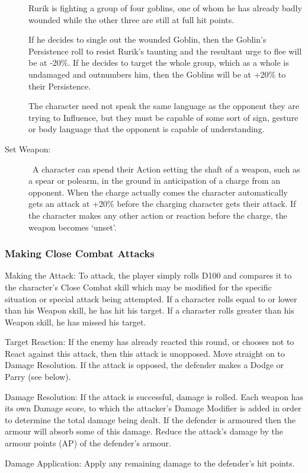 \begin{description}
	\begin{rpg-examplebox}
Rurik is fighting a group of four goblins, one of whom he has already badly wounded while the other three are still at full hit points. 

If he decides to single out the wounded Goblin, then the Goblin’s Persistence roll to resist Rurik’s taunting and the resultant urge to flee will be at -20\%. If he decides to target the whole group, which as a whole is undamaged and outnumbers him, then the Goblins will be at +20\% to their Persistence. 
	\end{rpg-examplebox}

The character need not speak the same language as the opponent they are trying to Influence, but they must be capable of some sort of sign, gesture or body language that the opponent is capable of understanding.

	\item[Set Weapon:]  A character can spend their Action setting the shaft of a weapon, such as a spear or polearm, in the ground in anticipation of a charge from an opponent. When the charge actually comes the character automatically gets an attack at +20\% before the charging character gets their attack. If the character makes any other action or reaction before the charge, the weapon becomes ‘unset’.
\end{description}


\subsubsection{Making Close Combat Attacks}
\begin{rpg-list}
\item Making the Attack: To attack, the player simply rolls D100 and compares it to the character’s Close Combat skill which may be modified for the specific situation or special attack being attempted. If a character rolls equal to or lower than his Weapon skill, he has hit his target. If a character rolls greater than his Weapon skill, he has missed his target. 

\item Target Reaction: If the enemy has already reacted this round, or chooses not to React against this attack, then this attack is unopposed. Move straight on to Damage Resolution. If the attack is opposed, the defender makes a Dodge or Parry (see below).

\item Damage Resolution: If the attack is successful, damage is rolled. Each weapon has its own Damage score, to which the attacker’s Damage Modifier is added in order to determine the total damage being dealt. If the defender is armoured then the armour will absorb some of this damage. Reduce the attack’s damage by the armour points (AP) of the defender’s armour. 

\item Damage Application: Apply any remaining damage to the defender’s hit points. 
\end{rpg-list}

